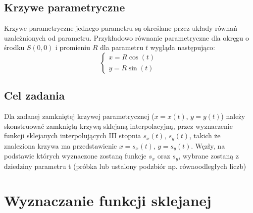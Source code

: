 \documentclass[11pt,wide]{article}
\begin{document}
\subsection{Krzywe parametryczne}
Krzywe parametryczne jednego parametru są określane przez układy równań uzależnionych od parametru. Przykładowo równanie parametryczne dla okręgu o środku $S(0,0)$ i promieniu $R$ dla parametru $t$ wygląda następująco:
\begin{equation}
    \begin{cases}
    x = R \cos(t)\\
    y = R \sin(t)
    \end{cases}
\end{equation}

\subsection{Cel zadania}

Dla zadanej zamkniętej krzywej parametrycznej ($x=x(t)$, $y=y(t)$) należy skonstruować zamkniętą krzywą sklejaną interpolacyjną, przez wyznaczenie funkcji sklejanych interpolujących III stopnia $s_x(t)$, $s_y(t)$, takich że znaleziona krzywa ma przedstawienie $x=s_x(t)$, $y=s_y(t)$. Węzły, na podstawie których wyznaczone zostaną funkcje $s_x$ oraz $s_y$, wybrane zostaną z dziedziny parametru t (próbka lub ustalony podzbiór np. równoodległych liczb)

\section{Wyznaczanie funkcji sklejanej}
\end{document}

